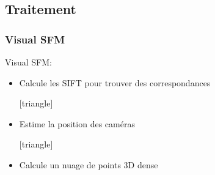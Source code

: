 	  
	  
	  
	  \subsection{Traitement}
	  
	  \begin{frame}
	  \frametitle{Visual SFM}
	   Visual SFM:
	  \begin{itemize}
	    [triangle]
	    \item Calcule les SIFT pour trouver des correspondances
	    
	    [triangle]
	    \item Estime la position des caméras
	    
	    [triangle]
	    \item Calcule un nuage de points 3D dense
	    \end{itemize}
	    

	  \end{frame}
	  	  
	  
